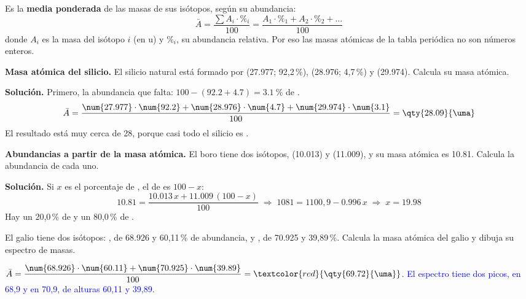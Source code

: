 \begin{definition}
    Es la \textbf{media ponderada} de las masas de sus isótopos, según su abundancia:
    \[ \bar{A} = \frac{\sum A_i \cdot \%_i}{100} = \frac{A_1 \cdot \%_1 + A_2 \cdot \%_2 + \dots}{100} \]
    donde \(A_i\) es la masa del isótopo \(i\) (en u) y \(\%_i\), su abundancia relativa. Por eso las masas atómicas de la tabla
    periódica no son números enteros.
\end{definition}

\begin{example}
    \textbf{Masa atómica del silicio.} El silicio natural está formado por  (\qty{27.977}{\uma}; 92,2\,\%),
     (\qty{28.976}{\uma}; 4,7\,\%) y  (\qty{29.974}{\uma}). Calcula su masa atómica.

    \textbf{Solución.} Primero, la abundancia que falta: \(100 - (\num{92.2} + \num{4.7}) = \qty{3.1}{\percent}\) de .
    \[ \bar{A} = \frac{\num{27.977} \cdot \num{92.2} + \num{28.976} \cdot \num{4.7} + \num{29.974} \cdot \num{3.1}}{100} = \qty{28.09}{\uma} \]
    El resultado está muy cerca de 28, porque casi todo el silicio es .
\end{example}

\begin{example}
    \textbf{Abundancias a partir de la masa atómica.} El boro tiene dos isótopos,  (\qty{10.013}{\uma}) y 
    (\qty{11.009}{\uma}), y su masa atómica es \qty{10.81}{\uma}. Calcula la abundancia de cada uno.

    \textbf{Solución.} Si \(x\) es el porcentaje de , el de  es \(100 - x\):
    \[ \num{10.81} = \frac{\num{10.013}\,x + \num{11.009}\,(100 - x)}{100} \;\Rightarrow\; 1081 = 1100{,}9 - \num{0.996}\,x
    \;\Rightarrow\; x = \num{19.98} \]
    Hay un 20,0\,\% de  y un 80,0\,\% de .
\end{example}

\begin{exercise}
    El galio tiene dos isótopos: , de \qty{68.926}{\uma} y 60,11\,\% de abundancia, y , de
    \qty{70.925}{\uma} y 39,89\,\%. Calcula la masa atómica del galio y dibuja su espectro de masas.
    \begin{solu}
        \(\bar{A} = \dfrac{\num{68.926} \cdot \num{60.11} + \num{70.925} \cdot \num{39.89}}{100} = \textcolor{red}{\qty{69.72}{\uma}}\).
        \textcolor{blue}{El espectro tiene dos picos, en 68,9 y en 70,9, de alturas 60,11 y 39,89.}
    \end{solu}
\end{exercise}

